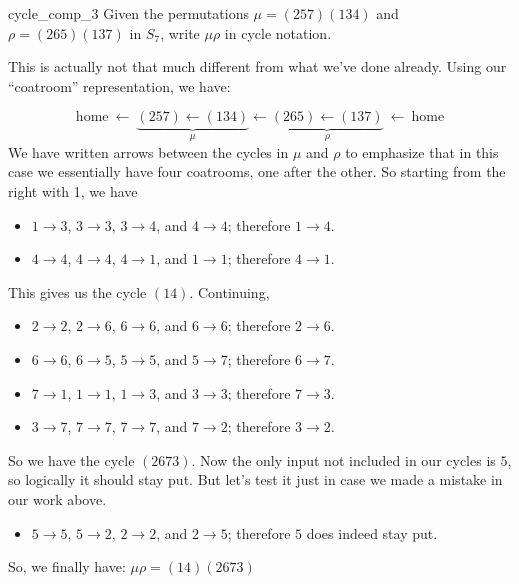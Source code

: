 \begin{example}{cycle_comp_3}
Given the permutations $\mu = (257)(134)$ and $\rho = (265)(137)$ in $S_7$, write $\mu \rho$ in cycle notation.

This is actually not that much different from what we've done already. Using our ``coatroom'' representation, we have:

\[ \text{home}~\leftarrow~\underbrace{(257)\leftarrow (134)}_{\mu} \leftarrow \underbrace{(265)\leftarrow (137)}_{\rho} ~\leftarrow~\text{home} \]
We have written arrows between the cycles in $\mu$ and $\rho$ to emphasize that in this case we essentially have four coatrooms, one after the other. So starting from the right with 1, we have
%
%
%
%
%

\begin{itemize}
\item
$1 \to 3$, $3 \to 3$, $3 \to 4$, and $4 \to 4$; therefore $1 \to 4$.
\item
$4 \to 4$, $4 \to 4$, $4 \to 1$, and $1 \to 1$; therefore $4 \to 1$. 
\end{itemize}

\noindent
This gives us the cycle $(14)$.  Continuing,
\begin{itemize}
\item
$2 \to 2$, $2 \to 6$, $6 \to 6$, and $6 \to 6$; therefore $2 \to 6$.
\item
$6 \to 6$, $6 \to 5$, $5 \to 5$, and $5 \to 7$; therefore $6 \to 7$.
\item
$7 \to 1$, $1 \to 1$, $1 \to 3$, and $3 \to 3$; therefore $7 \to 3$.
\item
$3 \to 7$, $7 \to 7$, $7 \to 7$, and $7 \to 2$; therefore $3 \to 2$.
\end{itemize}

\noindent
So we have the cycle  $(2673)$.  Now the only input not included in our cycles is $5$, so logically it should stay put.  But let's test it just in case we made a mistake in our work above.
\begin{itemize}
\item
$5 \to 5$, $5 \to 2$, $2 \to 2$, and $2 \to 5$; therefore $5$ does indeed stay put.
\end{itemize}

\noindent
So, we finally have:  $\mu \rho = (14)(2673)$
\end{example}

